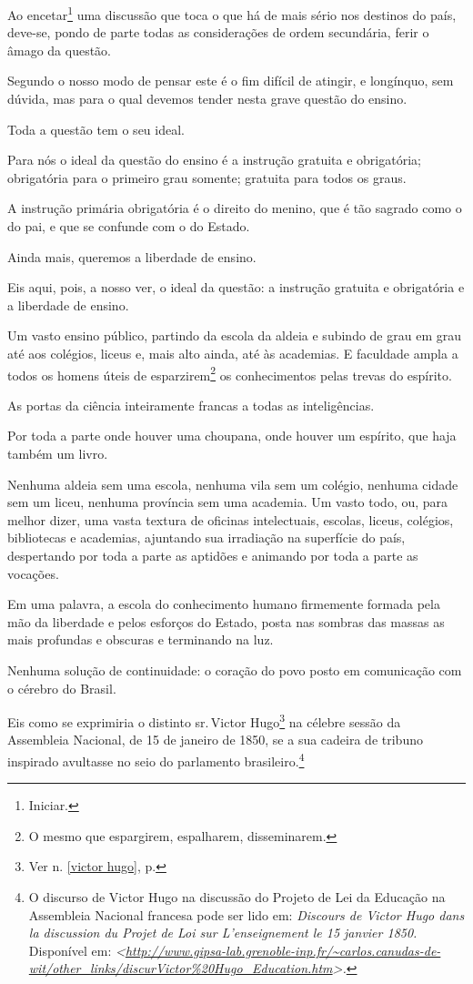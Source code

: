 Ao encetar\footnote{Iniciar.} uma discussão que toca o que há de mais
sério nos destinos do país, deve-se, pondo de parte todas as
considerações de ordem secundária, ferir o âmago da questão.

Segundo o nosso modo de pensar este é o fim difícil de atingir, e
longínquo, sem dúvida, mas para o qual devemos tender nesta grave
questão do ensino.

Toda a questão tem o seu ideal.

Para nós o ideal da questão do ensino é a instrução gratuita e
obrigatória; obrigatória para o primeiro grau somente; gratuita para
todos os graus.

A instrução primária obrigatória é o direito do menino, que é tão
sagrado como o do pai, e que se confunde com o do Estado.

Ainda mais, queremos a liberdade de ensino.

Eis aqui, pois, a nosso ver, o ideal da questão: a instrução gratuita e
obrigatória e a liberdade de ensino.

Um vasto ensino público, partindo da escola da aldeia e subindo de grau
em grau até aos colégios, liceus e, mais alto ainda, até às academias. E
faculdade ampla a todos os homens úteis de esparzirem\footnote{O mesmo
  que espargirem, espalharem, disseminarem.} os conhecimentos pelas
trevas do espírito.

As portas da ciência inteiramente francas a todas as inteligências.

Por toda a parte onde houver uma choupana, onde houver um espírito, que
haja também um livro.

Nenhuma aldeia sem uma escola, nenhuma vila sem um colégio, nenhuma
cidade sem um liceu, nenhuma província sem uma academia. Um vasto todo,
ou, para melhor dizer, uma vasta textura de oficinas intelectuais,
escolas, liceus, colégios, bibliotecas e academias, ajuntando sua
irradiação na superfície do país, despertando por toda a parte as
aptidões e animando por toda a parte as vocações.

Em uma palavra, a escola do conhecimento humano firmemente formada pela
mão da liberdade e pelos esforços do Estado, posta nas sombras das
massas as mais profundas e obscuras e terminando na luz.

Nenhuma solução de continuidade: o coração do povo posto em comunicação
com o cérebro do Brasil.

Eis como se exprimiria o distinto sr.\,Victor Hugo\footnote{Ver n. \ref{victor hugo}, p. \pageref{victor hugo}} 
na célebre sessão da Assembleia Nacional, de 15 de janeiro de 1850, se a
sua cadeira de tribuno inspirado avultasse no seio do parlamento
brasileiro.\footnote{O discurso de Victor Hugo na discussão do Projeto
  de Lei da Educação na Assembleia Nacional francesa pode ser lido em:
  \emph{Discours de Victor Hugo dans la discussion du Projet de Loi sur
  L'enseignement le 15 janvier 1850.} Disponível em:
  \emph{\textless{}\url{http://www.gipsa-lab.grenoble-inp.fr/~carlos.canudas-de-wit/other_links/discurVictor\%20Hugo_Education.htm}\textgreater.}}

